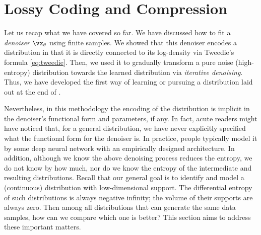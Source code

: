 \documentclass[../../book-main.tex]{subfiles}
\begin{document}





\section{Lossy Coding and Compression} \label{sec:lossy_compression}

Let us recap what we have covered so far. We have discussed how to fit a \textit{denoiser} \(\bar{\vx}_{\theta}\) using finite samples. We showed that this denoiser encodes a distribution in that it is directly connected to its log-density via Tweedie's formula \eqref{eq:tweedie}. Then, we used it to gradually transform a pure noise (high-entropy) distribution towards the learned distribution via \textit{iterative denoising}. Thus, we have developed the first way of learning or pursuing a distribution laid out at the end of .

Nevertheless, in this methodology the encoding of the distribution is implicit in the denoiser's functional form and parameters, if any. In fact, acute readers might have noticed that, for a general distribution, we have never explicitly specified what the functional form for the denoiser is. In practice, people typically model it by some deep neural network with an empirically designed architecture. In addition, although we know the above denoising process reduces the entropy, we do not know by how much,  nor do we know the entropy of the intermediate and resulting distributions. Recall that our general goal is to identify and model a (continuous) distribution with low-dimensional support. The differential entropy of such distributions is always negative infinity; the volume of their supports are always zero. Then among all distributions that can generate the same data samples, how can we compare which one is better? This section aims to address these important matters.
\end{document}
